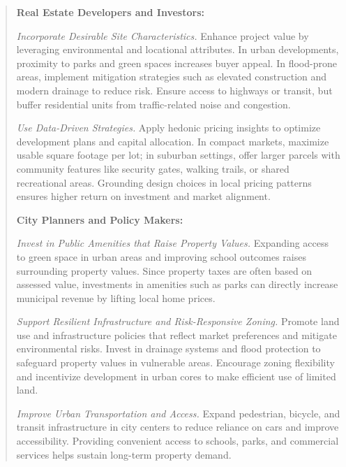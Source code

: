 \begin{quote}
\noindent \textbf{Real Estate Developers and Investors:}

\noindent \textit{Incorporate Desirable Site Characteristics.}
Enhance project value by leveraging environmental and locational attributes. In urban developments, proximity to parks and green spaces increases buyer appeal. In flood-prone areas, implement mitigation strategies such as elevated construction and modern drainage to reduce risk. Ensure access to highways or transit, but buffer residential units from traffic-related noise and congestion.

\noindent \textit{Use Data-Driven Strategies.}
Apply hedonic pricing insights to optimize development plans and capital allocation. In compact markets, maximize usable square footage per lot; in suburban settings, offer larger parcels with community features like security gates, walking trails, or shared recreational areas. Grounding design choices in local pricing patterns ensures higher return on investment and market alignment.



\noindent \textbf{City Planners and Policy Makers:}

\noindent \textit{Invest in Public Amenities that Raise Property Values.}
Expanding access to green space in urban areas and improving school outcomes raises surrounding property values. Since property taxes are often based on assessed value, investments in amenities such as parks can directly increase municipal revenue by lifting local home prices.

\noindent \textit{Support Resilient Infrastructure and Risk-Responsive Zoning.}
\noindent Promote land use and infrastructure policies that reflect market preferences and mitigate environmental risks. Invest in drainage systems and flood protection to safeguard property values in vulnerable areas. Encourage zoning flexibility and incentivize development in urban cores to make efficient use of limited land.

\noindent \textit{Improve Urban Transportation and Access.}
\noindent Expand pedestrian, bicycle, and transit infrastructure in city centers to reduce reliance on cars and improve accessibility. Providing convenient access to schools, parks, and commercial services helps sustain long-term property demand.

\end{quote}
